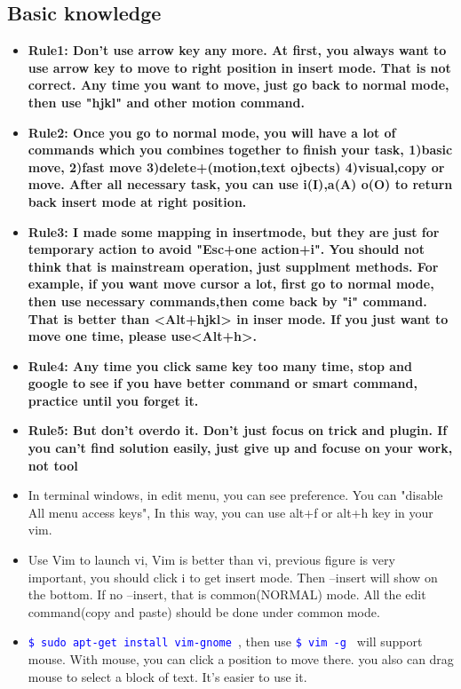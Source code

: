 \documentclass[a4paper,12pt,twoside]{book}
\newcommand{\linuxcommand}[1]{\texttt{\textcolor{blue}{\$ #1 \Pisymbol{psy}{191}}}}
\begin{document}
\subsection{Basic knowledge}

\begin{itemize}
		\item \textbf{Rule1: Don't use arrow key any more. At first, you always want to use arrow key to move to right position in insert mode. That is not correct. Any time you want to move, just go back to normal mode, then use "hjkl" and other motion command.}

		\item \textbf{Rule2: Once you go to normal mode, you will have a lot of commands which you combines together to finish your task, 1)basic move, 2)fast move 3)delete+(motion,text ojbects) 4)visual,copy or move. After all necessary task, you can use i(I),a(A) o(O) to return back insert mode at right position.}

		\item \textbf{Rule3: I made some mapping in insertmode, but they are just for temporary action to avoid "Esc+one action+i". You should not think that is mainstream operation, just supplment methods. For example, if you want move cursor a lot, first go to normal mode, then use necessary commands,then come back by "i" command. That is better than <Alt+hjkl> in inser mode. If you just want to move one time, please use<Alt+h>.}

		\item \textbf{Rule4: Any time you click same key too many time, stop and google to see if you have better command or smart command, practice until you forget it. }
		\item \textbf{Rule5: But don't overdo it. Don't just focus on trick and plugin. If you can't find solution easily, just give up and focuse on your work, not tool}

		\item In terminal windows, in edit menu, you can see preference. You can "disable All menu access keys", In this way, you can use alt+f or alt+h key in your vim. 

		\item Use Vim to launch vi, Vim is better than vi, previous figure is very important, you should click i to get insert mode. Then --insert will show on the bottom. If no --insert, that is common(NORMAL) mode. All the edit command(copy and paste) should be done under common mode. 

\item \linuxcommand{sudo apt-get install vim-gnome}, then use \linuxcommand{vim -g} will support mouse.  With mouse, you can click a position to move there. you also can drag mouse to select a block of text. It's easier to use it. 


\end{itemize}
\end{document}
